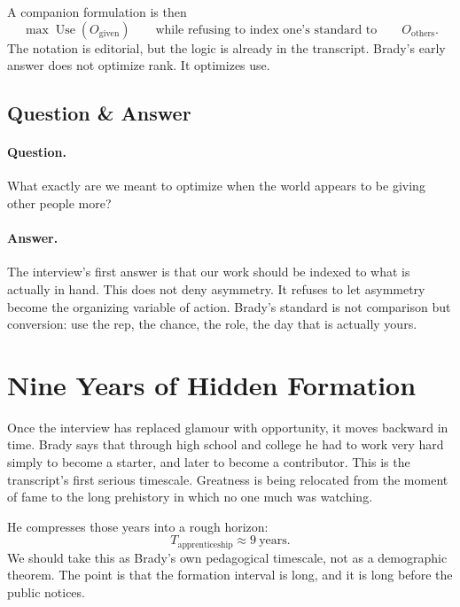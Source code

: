 A companion formulation is then
\begin{equation}
\max \operatorname{Use}(O_{\text{given}})
\qquad \text{while refusing to index one's standard to} \qquad
O_{\text{others}}.
\end{equation}
The notation is editorial, but the logic is already in the transcript. Brady's early answer does not optimize rank. It optimizes use.

\subsection{Question \& Answer}

\paragraph{Question.} What exactly are we meant to optimize when the world appears to be giving other people more?

\paragraph{Answer.} The interview's first answer is that our work should be indexed to what is actually in hand. This does not deny asymmetry. It refuses to let asymmetry become the organizing variable of action. Brady's standard is not comparison but conversion: use the rep, the chance, the role, the day that is actually yours.

\section{Nine Years of Hidden Formation}

Once the interview has replaced glamour with opportunity, it moves backward in time. Brady says that through high school and college he had to work very hard simply to become a starter, and later to become a contributor. This is the transcript's first serious timescale. Greatness is being relocated from the moment of fame to the long prehistory in which no one much was watching.

He compresses those years into a rough horizon:
\begin{equation}
T_{\text{apprenticeship}} \approx 9\ \text{years}.
\end{equation}
We should take this as Brady's own pedagogical timescale, not as a demographic theorem. The point is that the formation interval is long, and it is long before the public notices.

